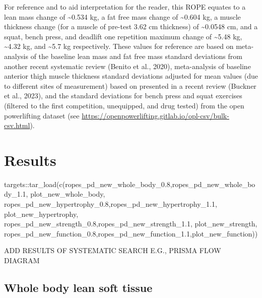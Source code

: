 \documentclass[
]{article}
\newenvironment{Shaded}{\begin{snugshade}}{\end{snugshade}}
\newcommand{\FloatTok}[1]{\textcolor[rgb]{0.68,0.00,0.00}{#1}}
\newcommand{\FunctionTok}[1]{\textcolor[rgb]{0.28,0.35,0.67}{#1}}
\newcommand{\NormalTok}[1]{\textcolor[rgb]{0.00,0.23,0.31}{#1}}
\newcommand{\SpecialCharTok}[1]{\textcolor[rgb]{0.37,0.37,0.37}{#1}}
\begin{document}
For reference and to aid interpretation for the reader, this ROPE
equates to a lean mass change of \textasciitilde0.534 kg, a fat free
mass change of \textasciitilde0.604 kg, a muscle thickness change (for a
muscle of pre-test 3.62 cm thickness) of \textasciitilde0.0548 cm, and a
squat, bench press, and deadlift one repetition maximum change of
\textasciitilde5.48 kg, \textasciitilde4.32 kg, and \textasciitilde5.7
kg respectively. These values for reference are based on meta-analysis
of the baseline lean mass and fat free mass standard deviations from
another recent systematic review (Benito et al., 2020), meta-analysis of
baseline anterior thigh muscle thickness standard deviations adjusted
for mean values (due to different sites of measurement) based on
presented in a recent review (Buckner et al., 2023), and the standard
deviations for bench press and squat exercises (filtered to the first
competition, unequipped, and drug tested) from the open powerlifting
dataset (see
\url{https://openpowerlifting.gitlab.io/opl-csv/bulk-csv.html}).

\section{Results}\label{results}

\begin{Shaded}
\begin{Highlighting}[]
\NormalTok{targets}\SpecialCharTok{::}\FunctionTok{tar\_load}\NormalTok{(}\FunctionTok{c}\NormalTok{(ropes\_pd\_new\_whole\_body\_0}\FloatTok{.8}\NormalTok{,ropes\_pd\_new\_whole\_body\_1}\FloatTok{.1}\NormalTok{, plot\_new\_whole\_body,}
\NormalTok{                    ropes\_pd\_new\_hypertrophy\_0}\FloatTok{.8}\NormalTok{,ropes\_pd\_new\_hypertrophy\_1}\FloatTok{.1}\NormalTok{, plot\_new\_hypertrophy,}
\NormalTok{                    ropes\_pd\_new\_strength\_0}\FloatTok{.8}\NormalTok{,ropes\_pd\_new\_strength\_1}\FloatTok{.1}\NormalTok{, plot\_new\_strength,}
\NormalTok{                    ropes\_pd\_new\_function\_0}\FloatTok{.8}\NormalTok{,ropes\_pd\_new\_function\_1}\FloatTok{.1}\NormalTok{,plot\_new\_function))}
\end{Highlighting}
\end{Shaded}

ADD RESULTS OF SYSTEMATIC SEARCH E.G., PRISMA FLOW DIAGRAM

\subsection{Whole body lean soft
tissue}\label{whole-body-lean-soft-tissue}
\end{document}
